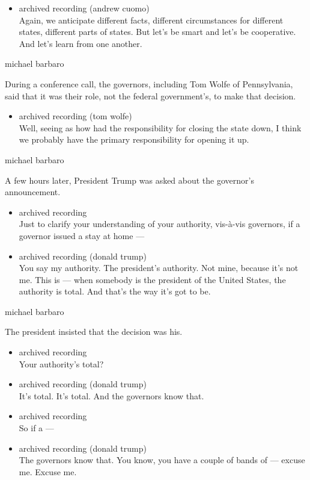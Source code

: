 \begin{itemize}
\tightlist
\item
  archived recording (andrew cuomo)\\
  Again, we anticipate different facts, different circumstances for
  different states, different parts of states. But let's be smart and
  let's be cooperative. And let's learn from one another.
\end{itemize}

michael barbaro

During a conference call, the governors, including Tom Wolfe of
Pennsylvania, said that it was their role, not the federal government's,
to make that decision.

\begin{itemize}
\tightlist
\item
  archived recording (tom wolfe)\\
  Well, seeing as how had the responsibility for closing the state down,
  I think we probably have the primary responsibility for opening it up.
\end{itemize}

michael barbaro

A few hours later, President Trump was asked about the governor's
announcement.

\begin{itemize}
\item
  archived recording\\
  Just to clarify your understanding of your authority, vis-à-vis
  governors, if a governor issued a stay at home ---
\item
  archived recording (donald trump)\\
  You say my authority. The president's authority. Not mine, because
  it's not me. This is --- when somebody is the president of the United
  States, the authority is total. And that's the way it's got to be.
\end{itemize}

michael barbaro

The president insisted that the decision was his.

\begin{itemize}
\item
  archived recording\\
  Your authority's total?
\item
  archived recording (donald trump)\\
  It's total. It's total. And the governors know that.
\item
  archived recording\\
  So if a ---
\item
  archived recording (donald trump)\\
  The governors know that. You know, you have a couple of bands of ---
  excuse me. Excuse me.
\end{itemize}

